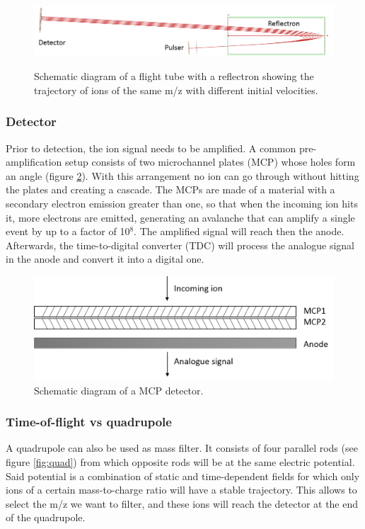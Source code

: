 \begin{figure}%
\centering
\includegraphics[width=0.8\linewidth]{pics/reflectron2.png}\label{fig:tofr_sim}
\caption{Schematic diagram of a flight tube with a reflectron showing the trajectory of  ions of the same m/z with different initial velocities.
}
\label{fig:tofr}
\end{figure}


\subsubsection{Detector}
Prior to detection, the ion signal needs to be amplified. A common pre-amplification setup consists of two microchannel plates (MCP) whose holes form an angle (figure \ref{fig:det}). With this arrangement no ion can go through without hitting the plates and creating a cascade. The MCPs are made of a material with a secondary electron emission greater than one, so that when the incoming ion hits it, more electrons are emitted, generating an avalanche that can amplify a single event by up to a factor of 10$^8$. The amplified signal will reach then the anode. Afterwards, the time-to-digital converter (TDC) will process the analogue signal in the anode and convert it into a digital one.


\begin{figure}%
\centering
\includegraphics[width=0.6\linewidth]{pics/mcp.png}
\centering
\caption{Schematic diagram of a MCP detector.}
\label{fig:det}
\end{figure}

\subsubsection{Time-of-flight vs quadrupole}
A quadrupole can also be used as mass filter. It consists of four parallel rods (see figure \ref{fig:quad})  from which opposite rods will be at the same electric potential. Said potential is a combination of static and time-dependent fields for which only ions of a certain mass-to-charge ratio will have a stable trajectory. This allows to select the m/z we want to filter, and these ions will reach the detector at the end of the quadrupole.

